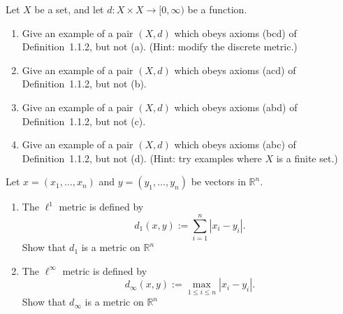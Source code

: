 \begin{problem} 
Let $X$ be a set, and let $d : X \times X \to [0,\infty)$ be a function. 

\begin{enumerate}
\item[(a)] Give an example of a pair $(X,d)$ which obeys axioms (bcd) of Definition~1.1.2, but not (a). 
\hfill (Hint: modify the discrete metric.)
\item[(b)] Give an example of a pair $(X,d)$ which obeys axioms (acd) of Definition~1.1.2, but not (b).
\item[(c)] Give an example of a pair $(X,d)$ which obeys axioms (abd) of Definition~1.1.2, but not (c).
\item[(d)] Give an example of a pair $(X,d)$ which obeys axioms (abc) of Definition~1.1.2, but not (d). 
\hfill (Hint: try examples where $X$ is a finite set.)
\end{enumerate}
\end{problem}

\begin{problem}[20 pts]  
Let $x=(x_1,\dots,x_n)$ and $y=(y_1,\dots,y_n)$ be vectors in $\mathbb{R}^n$.

\vfill
\bigskip

\begin{enumerate}
\item[(a)] The $\ell^1$ metric is defined by
\[
d_1(x,y) := \sum_{i=1}^n |x_i - y_i|.
\]
Show that $d_1$ is a metric on $\mathbb{R}^n$


\item[(b)] The $\ell^\infty$ metric is defined by
\[
d_\infty(x,y) := \max_{1 \leq i \leq n} |x_i - y_i|.
\]
Show that $d_{\infty}$ is a metric on $\mathbb{R}^n$

\end{enumerate}
\end{problem}


